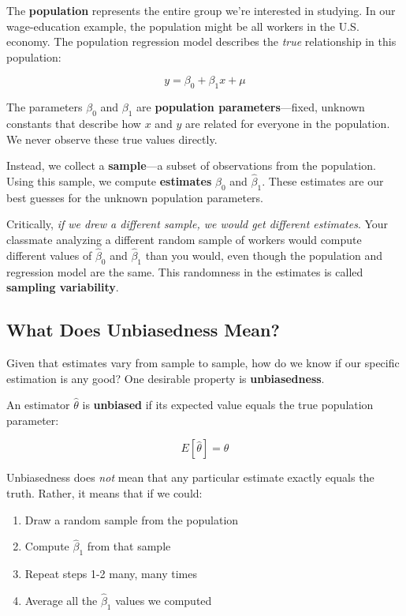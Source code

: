 \documentclass[
  letterpaper,
  DIV=11,
  numbers=noendperiod]{scrreprt}
\providecommand{\tightlist}{%
  \setlength{\itemsep}{0pt}\setlength{\parskip}{0pt}}
\begin{document}
The \textbf{population} represents the entire group we're interested in
studying. In our wage-education example, the population might be all
workers in the U.S. economy. The population regression model describes
the \emph{true} relationship in this population:

\[
y = \beta_0 + \beta_1 x + \mu
\]

The parameters \(\beta_0\) and \(\beta_1\) are \textbf{population
parameters}---fixed, unknown constants that describe how \(x\) and \(y\)
are related for everyone in the population. We never observe these true
values directly.

Instead, we collect a \textbf{sample}---a subset of observations from
the population. Using this sample, we compute \textbf{estimates}
\(\hat{\beta}_0\) and \(\hat{\beta}_1\). These estimates are our best
guesses for the unknown population parameters.

Critically, \emph{if we drew a different sample, we would get different
estimates}. Your classmate analyzing a different random sample of
workers would compute different values of \(\hat{\beta}_0\) and
\(\hat{\beta}_1\) than you would, even though the population and
regression model are the same. This randomness in the estimates is
called \textbf{sampling variability}.

\subsection{What Does Unbiasedness
Mean?}\label{what-does-unbiasedness-mean}

Given that estimates vary from sample to sample, how do we know if our
specific estimation is any good? One desirable property is
\textbf{unbiasedness}.

An estimator \(\hat{\theta}\) is \textbf{unbiased} if its expected value
equals the true population parameter:

\[
E[\hat{\theta}] = \theta
\]

Unbiasedness does \emph{not} mean that any particular estimate exactly
equals the truth. Rather, it means that if we could:

\begin{enumerate}
\def\labelenumi{\arabic{enumi}.}
\tightlist
\item
  Draw a random sample from the population
\item
  Compute \(\hat{\beta}_1\) from that sample
\item
  Repeat steps 1-2 many, many times
\item
  Average all the \(\hat{\beta}_1\) values we computed
\end{enumerate}
\end{document}
